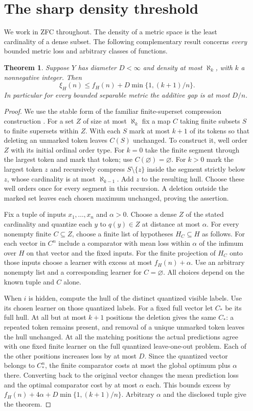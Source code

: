 \documentclass[11pt]{article}
\newtheorem{theorem}{Theorem}
\newcommand{\err}{\xi}
\begin{document}
\section{The sharp density threshold}
We work in ZFC throughout. The density of a metric space is the least cardinality of a dense subset. The following complementary result concerns \emph{every} bounded metric loss and arbitrary classes of functions.
\begin{theorem}\label{upper}
Suppose $Y$ has diameter $D<\infty$ and density at most $\aleph_k$, with $k$ a nonnegative integer. Then
\[
                \err_H(n)\le f_H(n)+D\min\{1,(k+1)/n\}.
\]
In particular for every bounded separable metric the additive gap is at most $D/n$.
\end{theorem}
\begin{proof}
We use the stable form of the familiar finite-superset compression construction \cite{emx}. For a set $Z$ of size at most $\aleph_k$ fix a map $C$ taking finite subsets $S$ to finite supersets within $Z$. With each $S$ mark at most $k+1$ of its tokens so that deleting an unmarked token leaves $C(S)$ unchanged. To construct it, well order $Z$ with its initial ordinal order type. For $k=0$ take the finite segment through the largest token and mark that token; use $C(\varnothing)=\varnothing$. For $k>0$ mark the largest token $z$ and recursively compress $S\setminus\{z\}$ inside the segment strictly below $z$, whose cardinality is at most $\aleph_{k-1}$. Add $z$ to the resulting hull. Choose these well orders once for every segment in this recursion. A deletion outside the marked set leaves each chosen maximum unchanged, proving the assertion.

Fix a tuple of inputs $x_1,\ldots,x_n$ and $\alpha>0$. Choose a dense $Z$ of the stated cardinality and quantize each $y$ to $q(y)\in Z$ at distance at most $\alpha$. For every nonempty finite $C\subseteq Z$, choose a finite list of hypotheses $H_C\subseteq H$ as follows. For each vector in $C^n$ include a comparator with mean loss within $\alpha$ of the infimum over $H$ on that vector and the fixed inputs. For the finite projection of $H_C$ onto those inputs choose a learner with excess at most $f_H(n)+\alpha$. Use an arbitrary nonempty list and a corresponding learner for $C=\varnothing$. All choices depend on the known tuple and $C$ alone.

When $i$ is hidden, compute the hull of the distinct quantized visible labels. Use its chosen learner on those quantized labels. For a fixed full vector let $C_*$ be its full hull. At all but at most $k+1$ positions the deletion gives the same $C_*$: a repeated token remains present, and removal of a unique unmarked token leaves the hull unchanged. At all the matching positions the actual predictions agree with one fixed finite learner on the full quantized leave-one-out problem. Each of the other positions increases loss by at most $D$. Since the quantized vector belongs to $C_*^n$, the finite comparator costs at most the global optimum plus $\alpha$ there. Converting back to the original vector changes the mean prediction loss and the optimal comparator cost by at most $\alpha$ each. This bounds excess by $f_H(n)+4\alpha+D\min\{1,(k+1)/n\}$. Arbitrary $\alpha$ and the disclosed tuple give the theorem.
\end{proof}
\end{document}
